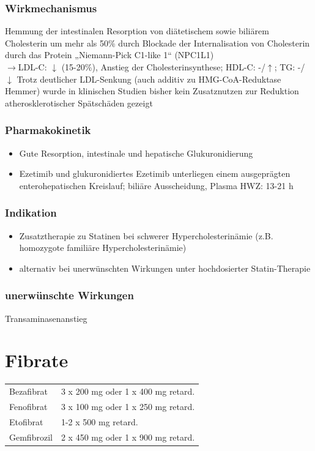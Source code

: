 \documentclass[10pt,a4paper]{report}
\begin{document}
\subsubsection{Wirkmechanismus} %
\label{par:wirkmechanismus}
Hemmung der intestinalen Resorption von diätetischem sowie biliärem Cholesterin um mehr als 50\% durch Blockade der Internalisation von Cholesterin durch das Protein „Niemann-Pick C1-like 1“ (NPC1L1)\\
$\rightarrow$LDL-C: $\downarrow$ (15-20\%), Anstieg der Cholesterinsynthese; HDL-C: -/$\uparrow$; TG: -/$\downarrow$
Trotz deutlicher LDL-Senkung (auch additiv zu HMG-CoA-Reduktase Hemmer) wurde in klinischen Studien bisher kein Zusatznutzen zur Reduktion atherosklerotischer Spätschäden gezeigt 
\subsubsection{Pharmakokinetik} %
\label{par:pharmakokinetik}
\begin{itemize}
	\item  Gute Resorption, intestinale und hepatische Glukuronidierung
	\item Ezetimib und glukuronidiertes Ezetimib unterliegen einem ausgeprägten enterohepatischen Kreislauf; biliäre Ausscheidung, Plasma HWZ: 13-21 h
\end{itemize}
\subsubsection{Indikation} %
\label{par:indikation}
\begin{itemize}
	\item Zusatztherapie zu Statinen bei schwerer Hypercholesterinämie (z.B. homozygote familiäre Hypercholesterinämie)
	\item alternativ bei unerwünschten Wirkungen unter hochdosierter Statin-Therapie
\end{itemize}
\subsubsection{unerwünschte Wirkungen} %
\label{par:unerw_nschte_wirkungen}
Transaminasenanstieg
\section{Fibrate} %
\label{sec:fibrate}
\begin{tabularx}{\textwidth}{XX}
Bezafibrat&3 x 200 mg oder 1 x 400 mg retard.\\
Fenofibrat&3 x 100 mg oder 1 x 250 mg retard.\\
Etofibrat&1-2 x 500 mg retard.\\
Gemfibrozil&2 x 450 mg oder 1 x 900 mg retard.\\
\end{tabularx}
\end{document}
